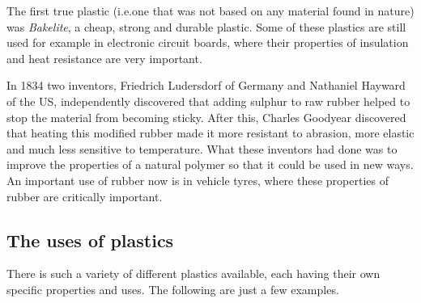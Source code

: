 \begin{IFact}{
The first true plastic (i.e.\@ one that was not based on any material found in nature) was \textit{Bakelite}, a cheap, strong and durable plastic. Some of these plastics are still used for example in electronic circuit boards, where their properties of insulation and heat resistance are very important.}
\end{IFact}
In 1834 two inventors, Friedrich Ludersdorf of Germany and Nathaniel Hayward of the US, independently discovered that adding sulphur to raw rubber helped to stop the material from becoming sticky. After this, Charles Goodyear discovered that heating this modified rubber made it more resistant to abrasion, more elastic and much less sensitive to temperature. What these inventors had done was to improve the properties of a natural polymer so that it could be used in new ways. An important use of rubber now is in vehicle tyres, where these properties of rubber are critically important.


\subsection{The uses of plastics}

There is such a variety of different plastics available, each having their own specific properties and uses. The following are just a few examples.

